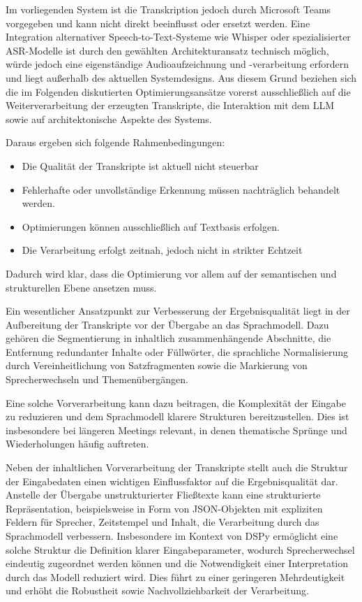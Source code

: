 Im vorliegenden System ist die Transkription jedoch durch Microsoft Teams vorgegeben und kann nicht direkt beeinflusst oder ersetzt werden. Eine Integration alternativer Speech-to-Text-Systeme wie Whisper oder spezialisierter ASR-Modelle ist durch den gewählten Architekturansatz technisch möglich, würde jedoch eine eigenständige Audioaufzeichnung und -verarbeitung erfordern und liegt außerhalb des aktuellen Systemdesigns. Aus diesem Grund beziehen sich die im Folgenden diskutierten Optimierungsansätze vorerst ausschließlich auf die Weiterverarbeitung der erzeugten Transkripte, die Interaktion mit dem LLM sowie auf architektonische Aspekte des Systems.

Daraus ergeben sich folgende Rahmenbedingungen: 
\begin{itemize}
    \item Die Qualität der Transkripte ist aktuell nicht steuerbar 
    \item Fehlerhafte oder unvollständige Erkennung müssen nachträglich behandelt werden.
    \item Optimierungen können ausschließlich auf Textbasis erfolgen. 
    \item Die Verarbeitung erfolgt zeitnah, jedoch nicht in strikter Echtzeit
\end{itemize}
Dadurch wird klar, dass die Optimierung vor allem auf der semantischen und strukturellen Ebene ansetzen muss. 

Ein wesentlicher Ansatzpunkt zur Verbesserung der Ergebnisqualität liegt in der Aufbereitung der Transkripte vor der Übergabe an das Sprachmodell. Dazu gehören die Segmentierung in inhaltlich zusammenhängende Abschnitte, die Entfernung redundanter Inhalte oder Füllwörter, die sprachliche Normalisierung durch Vereinheitlichung von Satzfragmenten sowie die Markierung von Sprecherwechseln und Themenübergängen. 

Eine solche Vorverarbeitung kann dazu beitragen, die Komplexität der Eingabe zu reduzieren und dem Sprachmodell klarere Strukturen bereitzustellen. Dies ist insbesondere bei längeren Meetings relevant, in denen thematische Sprünge und Wiederholungen häufig auftreten. 

Neben der inhaltlichen Vorverarbeitung der Transkripte stellt auch die Struktur der Eingabedaten einen wichtigen Einflussfaktor auf die Ergebnisqualität dar. Anstelle der Übergabe unstrukturierter Fließtexte kann eine strukturierte Repräsentation, beispielsweise in Form von JSON-Objekten mit expliziten Feldern für Sprecher, Zeitstempel und Inhalt, die Verarbeitung durch das Sprachmodell verbessern. Insbesondere im Kontext von DSPy ermöglicht eine solche Struktur die Definition klarer Eingabeparameter, wodurch Sprecherwechsel eindeutig zugeordnet werden können und die Notwendigkeit einer Interpretation durch das Modell reduziert wird. Dies führt zu einer geringeren Mehrdeutigkeit und erhöht die Robustheit sowie Nachvollziehbarkeit der Verarbeitung.

